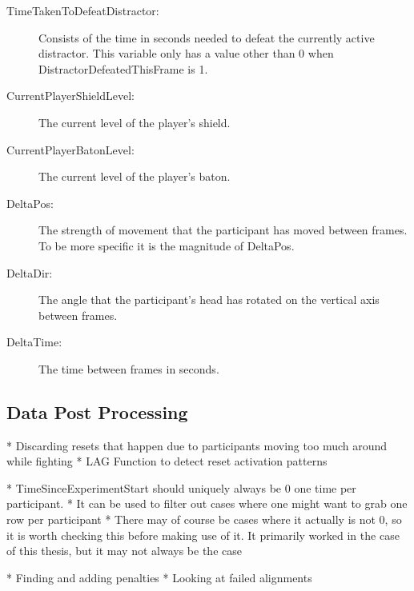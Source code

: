 \begin{description}
   \item[TimeTakenToDefeatDistractor:] Consists of the time in seconds needed to defeat the currently active distractor. This variable only has a value other than 0 when DistractorDefeatedThisFrame is 1. 
   \item[CurrentPlayerShieldLevel:] The current level of the player's shield. 
   \item[CurrentPlayerBatonLevel:] The current level of the player's baton. 
   \item[DeltaPos:] The strength of movement that the participant has moved between frames. To be more specific it is the magnitude of DeltaPos. 
   \item[DeltaDir:] The angle that the participant's head has rotated on the vertical axis between frames.
   \item[DeltaTime:] The time between frames in seconds.
\end{description}


\subsection{Data Post Processing}\label{sec:ex2postprocessingdetails}
  * Discarding resets that happen due to participants moving too much around while fighting
  * LAG Function to detect reset activation patterns
 
 * TimeSinceExperimentStart should uniquely always be 0 one time per participant.    
    * It can be used to filter out cases where one might want to grab one row per participant
    * There may of course be cases where it actually is not 0, so it is worth checking this before making use of it. It primarily worked in the case of this thesis, but it may not always be the case

* Finding and adding penalties
* Looking at failed alignments